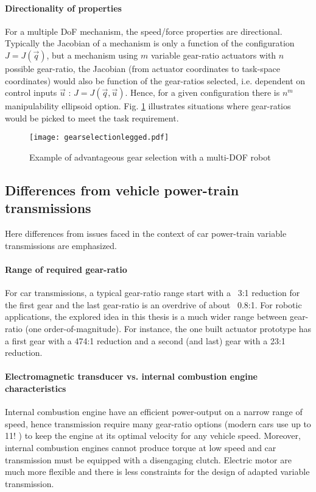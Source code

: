 \paragraph{Directionality of properties}
For a multiple DoF mechanism, the speed/force properties are directional. Typically the Jacobian of a mechanism is only a function of the configuration $J=J(\vec{q})$, but a mechanism using $m$ variable gear-ratio actuators with $n$ possible gear-ratio, the Jacobian (from actuator coordinates to task-space coordinates) would also be function of the gear-ratios selected, i.e. dependent on control inputs $\vec{u}$ : $J=J(\vec{q},\vec{u})$. Hence, for a given configuration there is $n^m$ manipulability ellipsoid option. Fig. \ref{fig:gearselectionlegged} illustrates situations where gear-ratios would be picked to meet the task requirement.


\begin{figure}[H]
	\centering
		\texttt{[image: gearselectionlegged.pdf]}
	\caption{Example of advantageous gear selection with a multi-DOF robot}
	\label{fig:gearselectionlegged}
\end{figure}


\subsection{Differences from vehicle power-train transmissions}

Here differences from issues faced in the context of car power-train variable transmissions are emphasized.

\paragraph{Range of required gear-ratio}
%
For car transmissions, a typical gear-ratio range start with a ~3:1 reduction for the first gear and the last gear-ratio is an overdrive of about ~0.8:1. For robotic applications, the explored idea in this thesis is a much wider range between gear-ratio (one order-of-magnitude). For instance, the one built actuator prototype has a first gear with a 474:1 reduction and a second (and last) gear with a 23:1 reduction. 


\paragraph{Electromagnetic transducer vs. internal combustion engine characteristics }
%
Internal combustion engine have an efficient power-output on a narrow range of speed, hence transmission require many gear-ratio options (modern cars use up to 11! \cite{goleski_multi-speed_2015}) to keep the engine at its optimal velocity for any vehicle speed. Moreover, internal combustion engines cannot produce torque at low speed and car transmission must be equipped with a disengaging clutch.  Electric motor are much more flexible and there is less constraints for the design of adapted variable transmission. 

